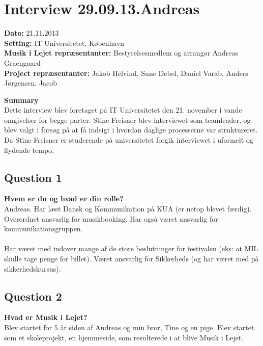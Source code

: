 \section{Interview 29.09.13.Andreas}

\textbf{Dato:} 21.11.2013 \\
\textbf{Setting:} IT Universitetet, København \\
\textbf{Musik i Lejet repræsentanter:} Bestyrelsesmedlem og arrangør Andreas Graengaard  \\
\textbf{Project repræsentanter:} Jakob Helvind, Sune Debel, Daniel Varab, Anders Jørgensen, Jacob 

\bigskip

\noindent \textbf{Summary} \\
Dette interview blev foretaget på IT Universitetet den 21. november i vande omgivelser for begge parter. Stine Freisner blev interviewet som teamleader, og blev valgt i forsøg på at få indsigt i hvordan daglige processerne var struktureret. Da Stine Freisner er studerende på universitetet forgik interviewet i uformelt og flydende tempo.


\subsection{Question 1}
\noindent \textbf{Hvem er du og hvad er din rolle?} \\
Andreas. Har læst Dansk og Kommunikation på KUA (er netop blevet færdig). Overordnet ansvarlig for musikbooking. Har også været ansvarlig for kommunikationsgruppen. 
\\ \\
Har været med indover mange af de store beslutninger for festivalen (eks: at MIL skulle tage penge for billet). Været ansvarlig for Sikkerheds (og har været med på sikkerhedskursus). 

\subsection{Question 2}
\noindent \textbf{Hvad er Musik i Lejet?} \\
Blev startet for 5 år siden af Andreas og min bror, Tine og en pige. Blev startet som et skoleprojekt, en hjemmeside, som resulterede i at blive Musik i Lejet.

